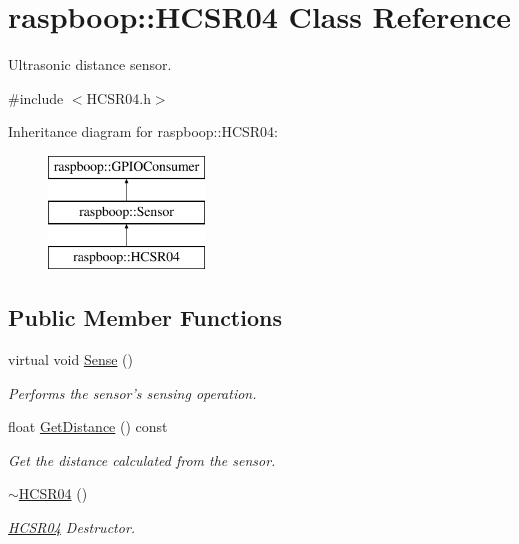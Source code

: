 \hypertarget{classraspboop_1_1HCSR04}{\section{raspboop\-:\-:H\-C\-S\-R04 Class Reference}
\label{classraspboop_1_1HCSR04}
}


Ultrasonic distance sensor.  




{\ttfamily \#include $<$H\-C\-S\-R04.\-h$>$}

Inheritance diagram for raspboop\-:\-:H\-C\-S\-R04\-:\begin{figure}[H]
\begin{center}
\leavevmode
\includegraphics[height=3.000000cm]{classraspboop_1_1HCSR04}
\end{center}
\end{figure}
\subsection*{Public Member Functions}
\begin{DoxyCompactItemize}
\item 
virtual void \hyperlink{classraspboop_1_1HCSR04_ab25ac4ca02a3a3e3b00d0df95c58f447}{Sense} ()
\begin{DoxyCompactList}\small\item\em Performs the sensor's sensing operation. \end{DoxyCompactList}\item 
float \hyperlink{classraspboop_1_1HCSR04_ad242d219ab8b6adbf1d684416ba47cb9}{Get\-Distance} () const 
\begin{DoxyCompactList}\small\item\em Get the distance calculated from the sensor. \end{DoxyCompactList}\item 
\hypertarget{classraspboop_1_1HCSR04_af82593e779415b2ec0b5820f45901187}{\hyperlink{classraspboop_1_1HCSR04_af82593e779415b2ec0b5820f45901187}{$\sim$\-H\-C\-S\-R04} ()}\label{classraspboop_1_1HCSR04_af82593e779415b2ec0b5820f45901187}

\begin{DoxyCompactList}\small\item\em \hyperlink{classraspboop_1_1HCSR04}{H\-C\-S\-R04} Destructor. \end{DoxyCompactList}\end{DoxyCompactItemize}
